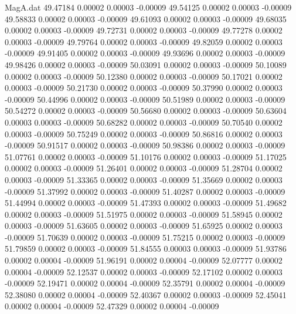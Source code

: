 \begin{filecontents}{MagA.dat}
  49.47184    0.00002    0.00003   -0.00009
  49.54125    0.00002    0.00003   -0.00009
  49.58833    0.00002    0.00003   -0.00009
  49.61093    0.00002    0.00003   -0.00009
  49.68035    0.00002    0.00003   -0.00009
  49.72731    0.00002    0.00003   -0.00009
  49.77278    0.00002    0.00003   -0.00009
  49.79764    0.00002    0.00003   -0.00009
  49.82059    0.00002    0.00003   -0.00009
  49.91405    0.00002    0.00003   -0.00009
  49.93696    0.00002    0.00003   -0.00009
  49.98426    0.00002    0.00003   -0.00009
  50.03091    0.00002    0.00003   -0.00009
  50.10089    0.00002    0.00003   -0.00009
  50.12380    0.00002    0.00003   -0.00009
  50.17021    0.00002    0.00003   -0.00009
  50.21730    0.00002    0.00003   -0.00009
  50.37990    0.00002    0.00003   -0.00009
  50.44996    0.00002    0.00003   -0.00009
  50.51989    0.00002    0.00003   -0.00009
  50.54272    0.00002    0.00003   -0.00009
  50.56680    0.00002    0.00003   -0.00009
  50.63604    0.00003    0.00003   -0.00009
  50.68282    0.00002    0.00003   -0.00009
  50.70540    0.00002    0.00003   -0.00009
  50.75249    0.00002    0.00003   -0.00009
  50.86816    0.00002    0.00003   -0.00009
  50.91517    0.00002    0.00003   -0.00009
  50.98386    0.00002    0.00003   -0.00009
  51.07761    0.00002    0.00003   -0.00009
  51.10176    0.00002    0.00003   -0.00009
  51.17025    0.00002    0.00003   -0.00009
  51.26401    0.00002    0.00003   -0.00009
  51.28704    0.00002    0.00003   -0.00009
  51.33365    0.00002    0.00003   -0.00009
  51.35669    0.00002    0.00003   -0.00009
  51.37992    0.00002    0.00003   -0.00009
  51.40287    0.00002    0.00003   -0.00009
  51.44994    0.00002    0.00003   -0.00009
  51.47393    0.00002    0.00003   -0.00009
  51.49682    0.00002    0.00003   -0.00009
  51.51975    0.00002    0.00003   -0.00009
  51.58945    0.00002    0.00003   -0.00009
  51.63605    0.00002    0.00003   -0.00009
  51.65925    0.00002    0.00003   -0.00009
  51.70639    0.00002    0.00003   -0.00009
  51.75215    0.00002    0.00003   -0.00009
  51.79859    0.00002    0.00003   -0.00009
  51.84555    0.00003    0.00003   -0.00009
  51.93786    0.00002    0.00004   -0.00009
  51.96191    0.00002    0.00004   -0.00009
  52.07777    0.00002    0.00004   -0.00009
  52.12537    0.00002    0.00003   -0.00009
  52.17102    0.00002    0.00003   -0.00009
  52.19471    0.00002    0.00004   -0.00009
  52.35791    0.00002    0.00004   -0.00009
  52.38080    0.00002    0.00004   -0.00009
  52.40367    0.00002    0.00003   -0.00009
  52.45041    0.00002    0.00004   -0.00009
  52.47329    0.00002    0.00004   -0.00009

\end{filecontents}
